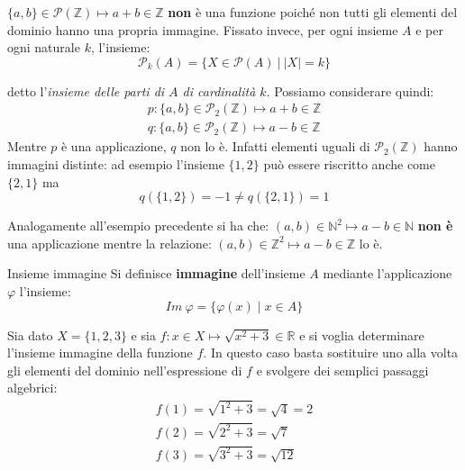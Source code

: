 \begin{example}
	$\{a,b\} \in \mathcal{P}(\mathbb{Z}) \mapsto a+b \in \mathbb{Z}$ \textbf{non} è una funzione poiché non tutti gli elementi del dominio hanno una propria immagine.
	Fissato invece, per ogni insieme $A$ e per ogni naturale $k$, l'insieme:
	\begin{equation}
		\mathcal{P}_{k}(A)=\{X \in \mathcal{P}(A) \ | \ |X|=k\}
	\end{equation}
	
	detto l'\textit{insieme delle parti di $A$ di cardinalità $k$}. Possiamo considerare quindi:
	\[
	\begin{array}{lc}
		p: \{a,b\} \in \mathcal{P}_{2}(\mathbb{Z}) \mapsto a+b \in \mathbb{Z} \\
		q: \{a,b\} \in \mathcal{P}_{2}(\mathbb{Z}) \mapsto a-b \in \mathbb{Z}
	\end{array}
	\]
	Mentre $p$ è una applicazione, $q$ non lo è. Infatti elementi uguali di $\mathcal{P}_{2}(\mathbb{Z})$ hanno immagini distinte: ad esempio l'insieme $\{1,2\}$ può essere riscritto anche come $\{2,1\}$ ma $$q(\{1,2\})=-1 \neq  q(\{2,1\})=1$$
\end{example}

\begin{example}
	Analogamente all'esempio precedente si ha che: $(a,b)\in \mathbb{N}^{2} \mapsto a-b \in \mathbb{N}$ \textbf{non è} una applicazione mentre la relazione: $(a,b) \in \mathbb{Z}^{2} \mapsto a-b \in \mathbb{Z}$ lo è.
\end{example}


\begin{defbox}{Insieme immagine}
	Si definisce \textbf{immagine} dell'insieme $A$ mediante l'applicazione $\varphi$ l'insieme:
	\begin{equation}
		Im \ \varphi = \{ \varphi(x)\; | \; x \in A \}
	\end{equation}
\end{defbox}

\begin{example}
	Sia dato $X=\{1,2,3\}$ e sia $f:x \in X \mapsto \sqrt{x^{2}+3} \in \mathbb{R}$ e si voglia determinare l'insieme immagine della funzione $f$. In questo caso basta sostituire uno alla volta gli elementi del dominio nell'espressione di $f$ e svolgere dei semplici passaggi algebrici:
	\begin{displaymath}
		\begin{array}{l}
			f(1)=\sqrt{1^{2}+3}=\sqrt{4}=2 \\
			f(2)=\sqrt{2^{2}+3}=\sqrt{7}   \\
			f(3)=\sqrt{3^{2}+3}=\sqrt{12}
		\end{array}
	\end{displaymath}
\end{example}

